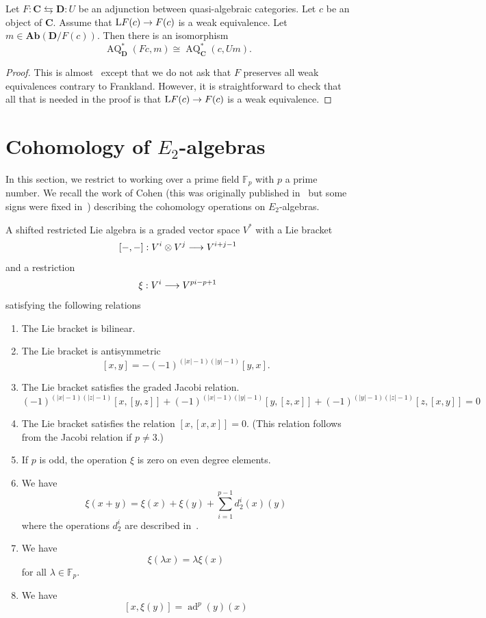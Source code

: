 \documentclass[AHL,Unicode,longabstracts,published]{cedram}
\DeclareMathOperator{\add}{ad}
\DeclareMathOperator{\AQ}{AQ}
\newcommand{\bAb}{\mathbf{Ab}}
\newcommand{\bfC}{\mathbf{C}}
\newcommand{\bfD}{\mathbf{D}}
\renewcommand{\L}{\mathrm{L}}
\newcommand{\FF}{\mathbb{F}}
\renewcommand*{\to}{\mathchoice{\longrightarrow}{\rightarrow}{\rightarrow}{\rightarrow}}
\newcommand*{\MK}{\mkern 2mu}
\newcommand{\FF}{\mathbb{F}}
\begin{document}
\begin{prop}\label{prop : base change}
Let $F:\bfC\leftrightarrows \bfD: U$ be an adjunction between quasi-algeb\-raic categories. Let $c$ be an object of $\bfC$. Assume that $\L F(c)\to F(c)$ is a weak equivalence. Let $m\in\bAb(\bfD/F(c))$. Then there is an isomorphism
\[
\AQ^*_{\bfD}(Fc,m)\cong\AQ^*_{\bfC}(c,Um).
\]
\end{prop}

\begin{proof}
This is almost~\cite[Proposition~4.10$\MK$(4)]{franklandbehavior} except that we do not ask that $F$ preserves all weak equivalences contrary to Frankland. However, it is straightforward to check that all that is needed in the proof is that $\L F(c)\to F(c)$ is a weak equivalence.
\end{proof}

\section{Cohomology of \texorpdfstring{$E_2$}{E\_2}-algebras}

In this section, we restrict to working over a prime field $\FF_p$ with $p$ a prime number. We recall the work of Cohen (this was originally published in~\cite[Chapter~III]{cohenladamay} but some signs were fixed in~\cite[Section~16]{galatiuscellular}) describing the cohomology operations on $E_2$-algebras.


\begin{defi}\label{defi3.1}
A shifted restricted Lie algebra is a graded vector space $V^*$ with a Lie bracket
\[
[-,-]: V^i\otimes V^j\to V^{i+j-1}
\]
and a restriction
\[
\xi: V^i\to V^{pi-p+1}
\]
satisfying the following relations
\begin{enumerate}
\item\label{defi3.1.1} The Lie bracket is bilinear.
\item\label{defi3.1.2} The Lie bracket is antisymmetric
\[
[x, y] = -(-1)^{(|x|-1)(|y|-1)}[y, x].
\]
\item\label{defi3.1.3} The Lie bracket satisfies the graded Jacobi relation.
\[
(-1)^{(|x|-1)(|z|-1)}[x, [y, z]] + (-1)^{(|x|-1)(|y|-1)}[y, [z, x]] + (-1)^{(|y|-1)(|z|-1)}[z, [x, y]]=0
\]
\item\label{defi3.1.4} The Lie bracket satisfies the relation $[x,[x,x]]=0$. (This relation follows from the Jacobi relation if $p\neq 3$.)
\item\label{defi3.1.5} If $p$ is odd, the operation $\xi$ is zero on even degree elements.
\item\label{defi3.1.6} We have
\[
\xi(x+y)=\xi(x)+\xi(y)+\sum_{i=1}^{p-1}d_2^i(x)(y)
\]
where the operations $d_2^i$ are described in~\cite[p.~218]{cohenladamay}.
\item\label{defi3.1.7} We have
\[
\xi(\lambda x)=\lambda\xi(x)
\]
for all $\lambda\in\FF_p$.
\item\label{defi3.1.8} We have
\[
[x,\xi(y)]=\add^p(y)(x)
\]
\end{enumerate}
\end{defi}
\end{document}
